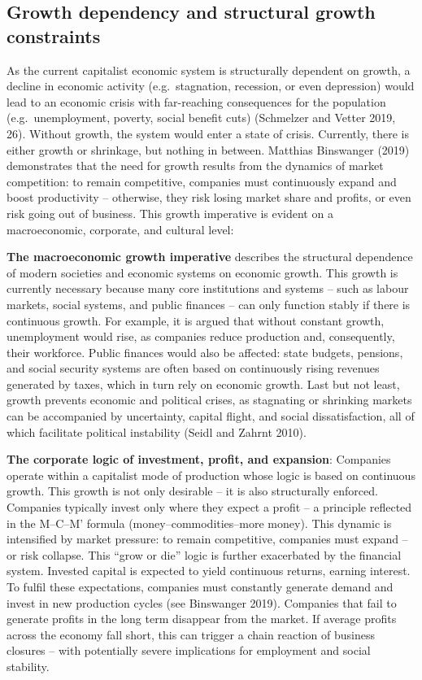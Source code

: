 \documentclass[
  a4paper,
  DIV=11,
  numbers=noendperiod,
  oneside,
  openany]{scrreprt}
\begin{document}
\subsection{Growth dependency and structural growth
constraints}\label{growth-dependency-and-structural-growth-constraints}

As the current capitalist economic system is structurally dependent on
growth, a decline in economic activity (e.g.~stagnation, recession, or
even depression) would lead to an economic crisis with far-reaching
consequences for the population (e.g.~unemployment, poverty, social
benefit cuts) (Schmelzer and Vetter 2019, 26). Without growth, the
system would enter a state of crisis. Currently, there is either growth
or shrinkage, but nothing in between. Matthias Binswanger (2019)
demonstrates that the need for growth results from the dynamics of
market competition: to remain competitive, companies must continuously
expand and boost productivity -- otherwise, they risk losing market
share and profits, or even risk going out of business. This growth
imperative is evident on a macroeconomic, corporate, and cultural level:

\textbf{The macroeconomic growth imperative} describes the structural
dependence of modern societies and economic systems on economic growth.
This growth is currently necessary because many core institutions and
systems -- such as labour markets, social systems, and public finances
-- can only function stably if there is continuous growth. For example,
it is argued that without constant growth, unemployment would rise, as
companies reduce production and, consequently, their workforce. Public
finances would also be affected: state budgets, pensions, and social
security systems are often based on continuously rising revenues
generated by taxes, which in turn rely on economic growth. Last but not
least, growth prevents economic and political crises, as stagnating or
shrinking markets can be accompanied by uncertainty, capital flight, and
social dissatisfaction, all of which facilitate political instability
(Seidl and Zahrnt 2010).

\textbf{The corporate logic of investment, profit, and expansion}:
Companies operate within a capitalist mode of production whose logic is
based on continuous growth. This growth is not only desirable -- it is
also structurally enforced. Companies typically invest only where they
expect a profit -- a principle reflected in the M--C--M' formula
(money--commodities--more money). This dynamic is intensified by market
pressure: to remain competitive, companies must expand -- or risk
collapse. This ``grow or die'' logic is further exacerbated by the
financial system. Invested capital is expected to yield continuous
returns, earning interest. To fulfil these expectations, companies must
constantly generate demand and invest in new production cycles (see
Binswanger 2019). Companies that fail to generate profits in the long
term disappear from the market. If average profits across the economy
fall short, this can trigger a chain reaction of business closures --
with potentially severe implications for employment and social
stability.
\end{document}
